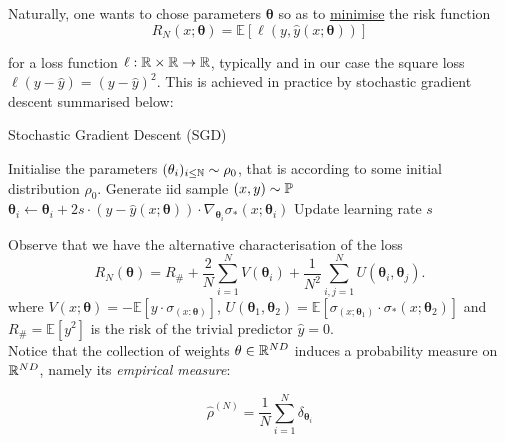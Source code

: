 \documentclass{article}
\begin{document}
Naturally, one wants to chose parameters $\mathbf{\theta}$ so as to \underline{minimise} the risk function 
\begin{equation}\label{eq: risk}
	R_{N}(x;\mathbf{\theta}) =\mathbb{E}[\ell(y, \hat{y}(x;\mathbf{\theta}))]
\end{equation}

for a loss function $ \ell:\mathbb{R}\times \mathbb{R} \to \mathbb{R}$, typically and in our case the square loss $ \ell(y-\hat{y})  = (y-\hat{y})^{2}$. This is achieved in practice by stochastic gradient descent summarised below:

\begin{codeblock}{Stochastic Gradient Descent (SGD)}\label{alg: SGD}
\begin{algorithmic}
\State Initialise the parameters $(\mathbf{\theta}_{i})_{i\leq \mathbb{N}} \sim \rho_{0}$, that is according to some initial distribution $ \rho_{0}$.
\State Generate iid sample $ (x, y)\sim \mathbb{P}$
\State $\mathbf{\theta}_{i}\gets\mathbf{\theta}_{i}+2s\cdot (y-\hat{y}(x;\mathbf{\theta}))\cdot \nabla_{\mathbf{\theta}_{i}}\sigma_{*}(x;\mathbf{\theta}_i)$ 
\State Update learning rate $ s$
\EndFor
\EndWhile
\end{algorithmic}

\end{codeblock}

Observe that we have the alternative characterisation of the loss
\begin{equation}\label{eq: loss expanded}
	R_{N}(\mathbf{\theta}) = R_{\#}+ \frac{2}{N}\displaystyle\sum^{N}_{i=1}V(\mathbf{\theta}_{i})+\frac{1}{N^{2}}\displaystyle\sum^{N}_{i,j=1}U(\mathbf{\theta}_{i},\mathbf{\theta}_{j}).
\end{equation} 
where $ V(x; \mathbf{\theta}) = -\mathbb{E}[y\cdot \sigma_(x: \mathbf{\theta})]$, $ U( \mathbf{\theta}_{1}, \mathbf{\theta}_{2}) =\mathbb{E}[\sigma_(x; \mathbf{\theta}_{1})\cdot \sigma_*(x; \mathbf{\theta}_{2})]$ and $ R_{\#}=\mathbb{E}[y^{2}]$ is the risk of the trivial predictor $ \hat{y} = 0$.\\ 

Notice that the collection of weights $  \mathbf{\theta}\in \mathbb{R}^{ND}$ induces a probability measure on $ \mathbb{R}^{ND}$, namely its \textit{empirical measure}:

\begin{equation}\label{eq: empirical measure}
	\hat{\rho}^{(N)} = \frac{1}{N}\displaystyle\sum^{N}_{i=1}\delta_{ \mathbf{\theta}_{i}} 
\end{equation}
\end{document}
